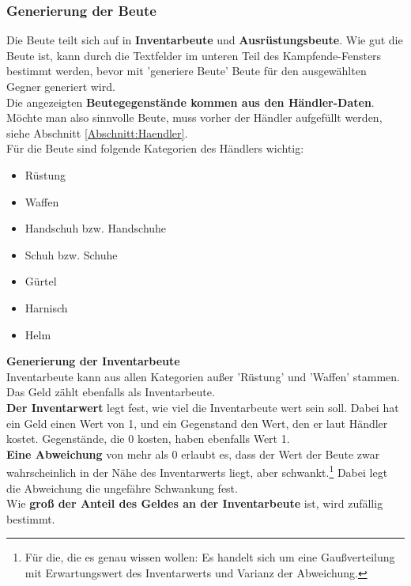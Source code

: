 \documentclass[11pt, a4paper, german]{article}
\begin{document}
\subsubsection{Generierung der Beute}\label{Abschnitt:Beute}
Die Beute teilt sich auf in \textbf{Inventarbeute} und \textbf{Ausrüstungsbeute}. Wie gut die Beute ist, kann durch die Textfelder im unteren Teil des Kampfende-Fensters bestimmt werden, bevor mit 'generiere Beute' Beute für den ausgewählten Gegner generiert wird.\\

Die angezeigten \textbf{Beutegegenstände kommen aus den Händler-Daten}. Möchte man also sinnvolle Beute, muss vorher der Händler aufgefüllt werden, siehe Abschnitt \ref{Abschnitt:Haendler}.\\

Für die Beute sind folgende Kategorien des Händlers wichtig: \begin{itemize}
\item Rüstung
\item Waffen
\item Handschuh bzw. Handschuhe
\item Schuh bzw. Schuhe
\item Gürtel
\item Harnisch
\item Helm
\end{itemize}

\textbf{Generierung der Inventarbeute}\\

Inventarbeute kann aus allen Kategorien außer 'Rüstung' und 'Waffen' stammen. Das Geld zählt ebenfalls als Inventarbeute.\\

\textbf{Der Inventarwert} legt fest, wie viel die Inventarbeute wert sein soll. Dabei hat ein Geld einen Wert von 1, und ein Gegenstand den Wert, den er laut Händler kostet. Gegenstände, die 0 kosten, haben ebenfalls Wert 1.\\

\textbf{Eine Abweichung} von mehr als 0 erlaubt es, dass der Wert der Beute zwar wahrscheinlich in der Nähe des Inventarwerts liegt, aber schwankt.\footnote{Für die, die es genau wissen wollen: Es handelt sich um eine Gaußverteilung mit Erwartungswert des Inventarwerts und Varianz der Abweichung.} Dabei legt die Abweichung die ungefähre Schwankung fest.\\

Wie \textbf{groß der Anteil des Geldes an der Inventarbeute} ist, wird zufällig bestimmt.\\
\end{document}
